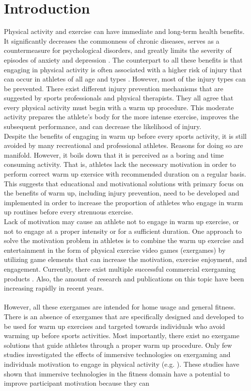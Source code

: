 \chapter{Introduction}
\label{chap:intro}
Physical activity and exercise can have immediate and long-term health benefits. It significantly decreases the commonness of chronic diseases, serves as a countermeasure for psychological disorders, and greatly limits the severity of episodes of anxiety and depression \cite{mayr2015prevention, warburton2006health}. The counterpart to all these benefits is that engaging in physical activity is often associated with a higher risk of injury that can occur in athletes of all age and types \cite{van1997severity}. However, most of the injury types can be prevented. There exist different injury prevention mechanisms that are suggested by sports professionals and physical therapists. They all agree that every physical activity must begin with a warm up procedure.  This moderate activity prepares the athlete's body for the more intense exercise, improves the subsequent performance, and can decrease the likelihood of injury. \\Despite the benefits of engaging in warm up before every sports activity, it is still avoided by many recreational and professional athletes. Reasons for doing so are manifold. However, it boils down that it is perceived as a boring and time consuming activity. That is, athletes lack the necessary motivation in order to  perform correct warm up exersice with recommended duration on a regular basis. This suggests that educational and motivational solutions with primary focus on the benefits of warm up, including injury prevention, need to be developed and implemented in order to increase the proportion of athletes who engage in warm up routines before every strenuous exercise.\\Lack of motivation may cause an athlete not to engage in warm up exercise, or not to engage at a proper intensity or for a sufficient duration. One approach to solve the motivation problem in athletes is to combine the warm up exercise and entertainment in the form of physical exercise video games (exergames) by utilizing game elements that can increase the motivation, exercise enjoyment, and engagement. Currently, there exist multiple successful commercial exergaming products \cite{wii, dance}. Also, the amount of research and publications on this topic have  been increasing rapidly in recent years. \\\\However, all these exergames are intended for home usage and general fitness. There is an absence of exergames that are specifically designed and developed to be used for warm up exercises and targeted towards individuals who avoid warming up before sports activities. Most importantly, there exist no exergame solutions that guide athletes through a proper warm up procedure.  Only few studies investigated the effects of immersive technologies on exergaming and individuals motivation to engage in physical activity (e.g. \cite{sun2012exergaming}). These studies have shown that immersive technologies in the fitness domain have a potential to improve participant motivation because they can 